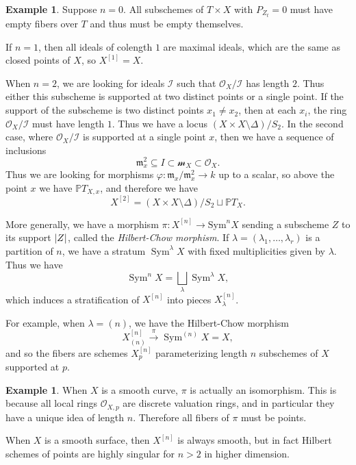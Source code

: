 \documentclass[leqno, openany]{memoir}
\theoremstyle{definition}
\newtheorem{exm}[thm]{Example}
\theoremstyle{remark}
\theoremstyle{plain}
\theoremstyle{definition}
\theoremstyle{remark}
\renewcommand{\P}{\mathbb{P}}
\newcommand{\mc}[1]{\mathcal{#1}}
\newcommand{\mf}[1]{\mathfrak{#1}}
\newcommand{\mr}[1]{\mathrm{#1}}
\newcommand{\1}{\mathbf{1}}
\newcommand{\2}{\mathbf{2}}
\newcommand{\3}{\mathbf{3}}
\DeclareMathOperator{\Sym}{Sym}
\begin{document}
\begin{exm}
    Suppose $n = 0$. All subschemes of $T \times X$ with $P_{Z_t} = 0$ must have empty fibers over $T$ and thus must be empty themselves.

    If $n = 1$, then all ideals of colength $1$ are maximal ideals, which are the same as closed points of $X$, so $X^{[1]} = X$.

    When $n = 2$, we are looking for ideals $\mc{I}$ such that $\mc{O}_X / \mc{I}$ has length $2$. Thus either this subscheme is supported at two distinct points or a single point. If the support of the subscheme is two distinct points $x_1 \neq x_2$, then at each $x_i$, the ring $\mc{O}_X/\mc{I}$ must have length $1$. Thus we have a locus $(X \times X \setminus \Delta) / S_2$. In the second case, where $\mc{O}_X / \mc{I}$ is supported at a single point $x$, then we have a sequence of inclusions
    \[ \mf{m}_x^2 \subseteq I \subset \mc{m}_X \subset \mc{O}_X. \]
    Thus we are looking for morphisms $\varphi \colon \mf{m}_x / \mf{m}_x^2 \to k$ up to a scalar, so above the point $x$ we have $\P T_{X,x}$, and therefore we have
    \[ X^{[2]} = (X \times X \setminus \Delta) / S_2 \sqcup \P T_X. \]
\end{exm}

More generally, we have a morphism $\pi \colon X^{[n]} \to \mr{Sym}^n X$ sending a subscheme $Z$ to its support $\abs{Z}$, called the \textit{Hilbert-Chow morphism}. If $\lambda = (\lambda_1, \ldots, \lambda_r)$ is a partition of $n$, we have a stratum $\Sym^{\lambda} X$ with fixed multiplicities given by $\lambda$. Thus we have
\[ \Sym^n X = \bigsqcup_{\lambda} \Sym^{\lambda} X, \]
which induces a stratification of $X^{[n]}$ into pieces $X_{\lambda}^{[n]}$.

For example, when $\lambda = (n)$, we have the Hilbert-Chow morphism
\[ X_{(n)}^{[n]} \xrightarrow{\pi} \Sym^{(n)} X = X, \]
and so the fibers are schemes $X_p^{[n]}$ parameterizing length $n$ subschemes of $X$ supported at $p$.

\begin{exm}
    When $X$ is a smooth curve, $\pi$ is actually an isomorphism. This is because all local rings $\mc{O}_{X,p}$ are discrete valuation rings, and in particular they have a unique idea of length $n$. Therefore all fibers of $\pi$ must be points.
\end{exm}

When $X$ is a smooth surface, then $X^{[n]}$ is always smooth, but in fact Hilbert schemes of points are highly singular for $n > 2$ in higher dimension.
\end{document}
